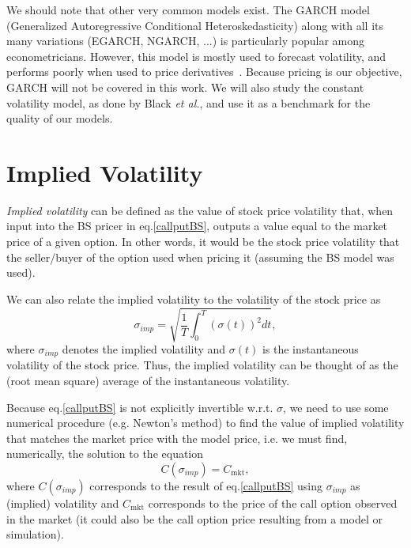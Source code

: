 We should note that other very common models exist. The GARCH model~\citep{bollerslev} (Generalized Autoregressive Conditional Heteroskedasticity) along with all its many variations (EGARCH, NGARCH, ...) is particularly popular among econometricians. However, this model is mostly used to forecast volatility, and performs poorly when used to price derivatives~\citep{chourdakis}. Because pricing is our objective, GARCH will not be covered in this work. We will also study the constant volatility model, as done by Black \textit{et al.}, and use it as a benchmark for the quality of our models.



\section{Implied Volatility}
\label{section:impliedvolatility}
\emph{Implied volatility} can be defined as the value of stock price volatility that, when input into the BS pricer in eq.\eqref{callputBS}, outputs a value equal to the market price of a given option.
In other words, it would be the stock price volatility that the seller/buyer of the option used when pricing it (assuming the BS model was used).

We can also relate the implied volatility to the volatility of the stock price as
\begin{equation}
\sigma_{imp}=\sqrt{\frac{1}{T}\int_0^T(\sigma(t))^2dt},
\end{equation}
\noindent where $\sigma_{imp}$ denotes the implied volatility and $\sigma(t)$ is the instantaneous volatility of the stock price. Thus, the implied volatility can be thought of as the (root mean square) average of the instantaneous volatility.

Because eq.\eqref{callputBS} is not explicitly invertible w.r.t. $\sigma$, we need to use some numerical procedure (e.g. Newton's method) to find the value of implied volatility that matches the market price with the model price, i.e. we must find, numerically, the solution to the equation
\begin{equation}\label{impvolform}
C(\sigma_{imp})=C_{\mathrm{mkt}},
\end{equation}
\noindent where $C(\sigma_{imp})$ corresponds to the result of eq.\eqref{callputBS} using $\sigma_{imp}$ as (implied) volatility and $C_{\mathrm{mkt}}$ corresponds to the price of the call option observed in the market (it could also be the call option price resulting from a model or simulation).


